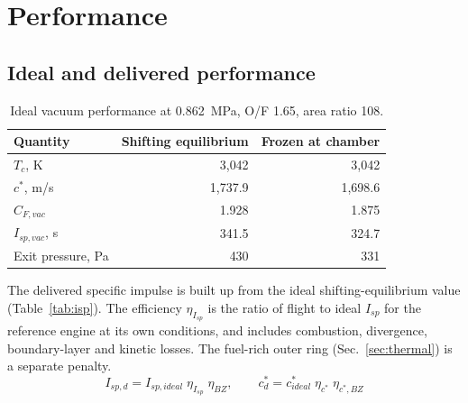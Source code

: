 \documentclass[10pt]{article}
\begin{document}
\section{Performance}
\subsection{Ideal and delivered performance}
\begin{table}[H]\centering\small\caption{Ideal vacuum performance at 0.862~MPa, O/F 1.65, area ratio 108.}\label{tab:ideal}
\begin{tabular}{lrr}\toprule
Quantity & Shifting equilibrium & Frozen at chamber \\\midrule
$T_c$, K & 3{,}042 & 3{,}042 \\
$c^*$, m/s & 1{,}737.9 & 1{,}698.6 \\
$C_{F,vac}$ & 1.928 & 1.875 \\
$I_{sp,vac}$, s & 341.5 & 324.7 \\
Exit pressure, Pa & 430 & 331 \\
\bottomrule\end{tabular}\end{table}

The delivered specific impulse is built up from the ideal shifting-equilibrium value (Table~\ref{tab:isp}). The
efficiency $\eta_{I_{sp}}$ is the ratio of flight to ideal $I_{sp}$ for the reference engine at its own conditions,
and includes combustion, divergence, boundary-layer and kinetic losses. The fuel-rich outer ring
(Sec.~\ref{sec:thermal}) is a separate penalty.
\begin{equation}
I_{sp,d} = I_{sp,ideal}\;\eta_{I_{sp}}\;\eta_{BZ}, \qquad c^*_d = c^*_{ideal}\;\eta_{c^*}\;\eta_{c^*,BZ}
\end{equation}
\begin{table}[H]\centering\small\caption{Delivered performance build-up.}\label{tab:isp}
\end{table}
\end{document}
